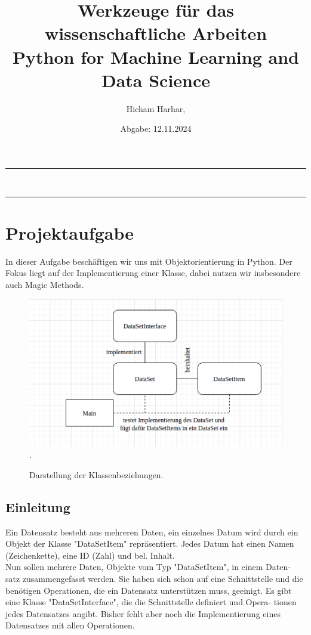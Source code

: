 \documentclass{article}
\title{Werkzeuge für das wissenschaftliche Arbeiten \\[0.1cm]  {\large Python for Machine Learning and Data Science} }
\author{ {\large Hicham Harhar, } }
\date{Abgabe: 12.11.2024}
\begin{document}
	
	\maketitle
\hrule\hfill\\	
	
	\tableofcontents
\hrule

	

\section{Projektaufgabe}
	In dieser Aufgabe beschäftigen wir uns mit Objektorientierung in Python. Der
	Fokus liegt auf der Implementierung einer Klasse, dabei nutzen wir insbesondere
	auch Magic Methods.
\begin{figure}[H]
		\begin{minipage}{\linewidth}
			\renewcommand{\footnoterule}{}
			\begin{center}
				\includegraphics[width=0.77\linewidth]{bild.png}.
			\end{center}
			\caption[Darstellung der Klassenbeziehungen] {Darstellung der Klassenbeziehungen.}
		\end{minipage}
\end{figure}
\subsection{Einleitung}
Ein Datensatz besteht aus mehreren Daten, ein einzelnes Datum wird durch ein
Objekt der Klasse "DataSetItem" repräsentiert. Jedes Datum hat einen Namen
(Zeichenkette), eine ID (Zahl) und bel. Inhalt.\\[0.25cm]

Nun sollen mehrere Daten, Objekte vom Typ "DataSetItem", in einem Daten-
satz zusammengefasst werden. Sie haben sich schon auf eine Schnittstelle und
die benötigen Operationen, die ein Datensatz unterstützen muss, geeinigt. Es
gibt eine Klasse "DataSetInterface", die die Schnittstelle definiert und Opera-
tionen jedes Datensatzes angibt. Bisher fehlt aber noch die Implementierung
eines Datensatzes mit allen Operationen.\\[0.25cm]
\end{document}
